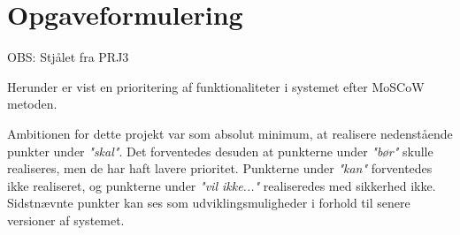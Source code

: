 \chapter{Opgaveformulering}
\label{ch:Opgaveformulering}

OBS: Stjålet fra PRJ3

Herunder er vist en prioritering af funktionaliteter i systemet efter MoSCoW metoden. 

Ambitionen for dette projekt var som absolut minimum, at realisere nedenstående punkter under \textit{"skal"}. 
Det forventedes desuden at punkterne under \textit{"bør"} skulle realiseres, men de har haft lavere prioritet.
Punkterne under \textit{"kan"} forventedes ikke realiseret, og punkterne under \textit{"vil ikke..."} realiseredes med sikkerhed ikke. 
Sidstnævnte punkter kan ses som udviklingsmuligheder i forhold til senere versioner af systemet. 

